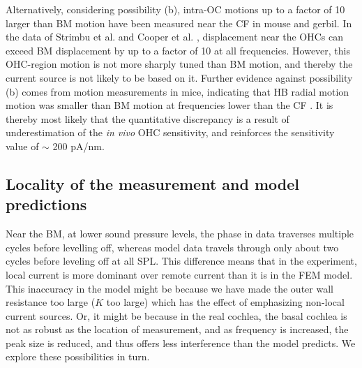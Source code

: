 \documentclass{biophys-new}
\begin{document}
\par{Alternatively, considering possibility (b), intra-OC motions up to a factor of 10 larger than BM motion have been measured near the CF in mouse and gerbil. In the data of Strimbu et al. \cite{strimbu} and Cooper et al. \cite{cooper}, displacement near the OHCs can exceed BM displacement by up to a factor of 10 at all frequencies. However, this OHC-region motion is not more sharply tuned than BM motion, and thereby the current source is not likely to be based on it.  Further evidence against possibility (b) comes from motion measurements in mice, indicating that HB radial motion motion was smaller than BM motion at frequencies lower than the CF \cite{lee}. It is thereby most likely that the quantitative discrepancy is a result of underestimation of the \textit{in vivo} OHC sensitivity, and reinforces the sensitivity value of $\sim$ 200 pA/nm.}


\subsection{Locality of the measurement and model predictions}
\par{Near the BM, at lower sound pressure levels, the phase in data traverses multiple cycles before levelling off, whereas model data travels through only about two cycles before leveling off at all SPL. This difference means that in the experiment, local current is more dominant over remote current than it is in the FEM model. This inaccuracy in the model might be because we have made the outer wall resistance too large ($K$ too large) which has the effect of emphasizing non-local current sources.  Or, it might be because in the real cochlea, the basal cochlea is not as robust as the location of measurement, and as frequency is increased, the peak size is reduced, and thus offers less interference than the model predicts.  We explore these possibilities in turn.}
\end{document}

